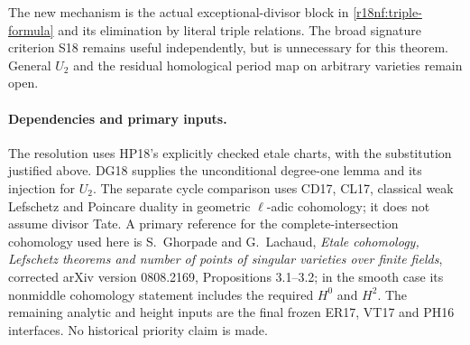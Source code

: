 The new mechanism is the actual exceptional-divisor block
in \eqref{r18nf:triple-formula} and its elimination by
literal triple relations.  The broad signature criterion
S18 remains useful independently, but is unnecessary for
this theorem.  General $U_2$ and the residual homological
period map on arbitrary varieties remain open.

\paragraph{Dependencies and primary inputs.}
The resolution uses HP18's explicitly checked etale charts,
with the substitution justified above.  DG18 supplies the
unconditional degree-one lemma and its injection for $U_2$.
The separate cycle comparison uses CD17, CL17, classical
weak Lefschetz and Poincare duality in geometric $\ell$-adic
cohomology; it does not assume divisor Tate.  A primary
reference for the complete-intersection cohomology used here
is S.~Ghorpade and G.~Lachaud, \emph{Etale cohomology,
Lefschetz theorems and number of points of singular varieties
over finite fields}, corrected arXiv version 0808.2169,
Propositions 3.1--3.2; in the smooth case its nonmiddle
cohomology statement includes the required $H^0$ and $H^2$.
The remaining analytic
and height inputs are the final frozen ER17, VT17 and PH16
interfaces.  No historical priority claim is made.
